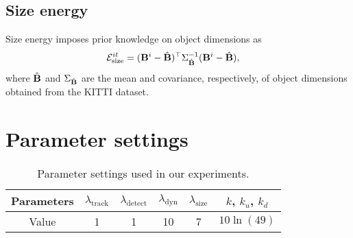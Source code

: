 \documentclass[10pt,twocolumn,letterpaper]{article}
\begin{document}
\subsection{Size energy}
Size energy imposes prior knowledge on object dimensions as
\begin{align}
  \label{eq:totalSizeEnergy}
  \mathcal{E}^{it}_{\text{size}} &= (\mathbf{B}^{i} - \hat{\mathbf{B}})^\top\Sigma_{\hat{\mathbf{B}}}^{-1}(\mathbf{B}^{i} -
  \hat{\mathbf{B}}),
\end{align}
where $\hat{\mathbf{B}}$ and $\Sigma_{\hat{\mathbf{B}}}$ are the mean and covariance, respectively, of object dimensions obtained from the KITTI dataset.

\section{Parameter settings}
\begin{table}[!h]
  \centering
\begin{tabular}{cccccc}
  \toprule
  Parameters
  & $\lambda_{\text{track}}$  
  & $\lambda_{\text{detect}}$ 
  & $\lambda_{\text{dyn}}$    
  & $\lambda_{\text{size}}$   
  & $k$, $k_u$, $k_d$ \\
  \midrule
  Value
  & 1
  & 1
  & 10
  & 7
  & $10\ln(49)$\\
  \bottomrule
\end{tabular}
\caption{Parameter settings used in our experiments.}
\label{tab:paramters}
\end{table}
\end{document}
